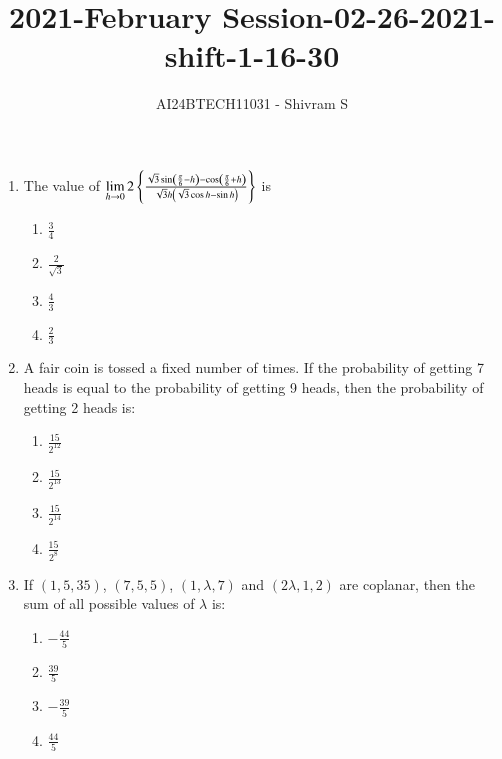 \documentclass[journal]{IEEEtran}
\begin{document}

\onecolumn

\title{2021-February Session-02-26-2021-shift-1-16-30}
\author{AI24BTECH11031 - Shivram S}
\maketitle
\bigskip

\renewcommand{\thefigure}{\theenumi}
\renewcommand{\thetable}{\theenumi}

\begin{enumerate}
    \item The value of $\lim\limits_{h \to 0} 2\left\{\frac{\sqrt{3}\sin\left(\frac{\pi}{6} - h\right) - \cos\left(\frac{\pi}{6} + h\right)}{\sqrt{3}h\left(\sqrt{3}\cos h - \sin h\right)}\right\}$ is
    
    \begin{multicols}{4}
    \begin{enumerate}
        \item $\frac{3}{4}$
        \item $\frac{2}{\sqrt{3}}$
        \item $\frac{4}{3}$
        \item $\frac{2}{3}$
    \end{enumerate}
    \end{multicols}

    \item A fair coin is tossed a fixed number of times. If the probability of
    getting 7 heads is equal to the probability of getting 9 heads, then the
    probability of getting 2 heads is:
    
    \begin{multicols}{4}
    \begin{enumerate}
        \item $\frac{15}{2^{12}}$
        \item $\frac{15}{2^{13}}$
        \item $\frac{15}{2^{14}}$
        \item $\frac{15}{2^{8}}$
    \end{enumerate}
    \end{multicols}

    \item If $(1, 5, 35)$, $(7, 5, 5)$, $(1, \lambda, 7)$ and $(2\lambda, 1, 2)$ are
    coplanar, then the sum of all possible values of $\lambda$ is:

    \begin{multicols}{4}
    \begin{enumerate}
        \item $-\frac{44}{5}$
        \item $\frac{39}{5}$
        \item $-\frac{39}{5}$
        \item $\frac{44}{5}$
    \end{enumerate}
    \end{multicols}


\end{enumerate}
\end{document}
